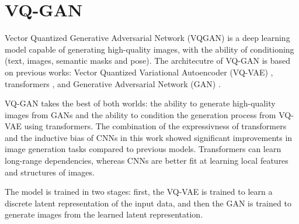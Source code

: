 \section{VQ-GAN}
\label{sec:vqgan}

Vector Quantized Generative Adversarial Network (VQGAN) \cite{vqgan} is a deep learning model capable of generating high-quality images, with the ability of conditioning (text, images, semantic masks and pose). The architecutre of VQ-GAN is based on previous works: Vector Quantized Variational Autoencoder (VQ-VAE) \cite{vqvae}, transformers \cite{transformer}, and Generative Adversarial Network (GAN) \cite{gan}.

VQ-GAN takes the best of both worlds: the ability to generate high-quality images from GANs and the ability to condition the generation process from VQ-VAE using transformers. The combination of the expressivness of transformers and the inductive bias of CNNs \cite{cnn} in this work showed significant improvements in image generation tasks compared to previous models. Transformers can learn long-range dependencies, whereas CNNs are better fit at learning local features and structures of images.

The model is trained in two stages: first, the VQ-VAE is trained to learn a discrete latent representation of the input data, and then the GAN is trained to generate images from the learned latent representation.